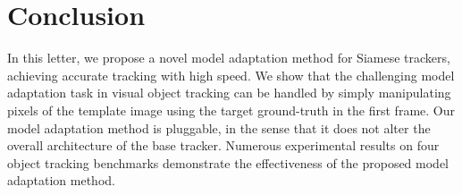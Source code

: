\documentclass[journal]{IEEEtran}
\begin{document}
\section{Conclusion}
In this letter, we propose a novel model adaptation method for Siamese trackers, achieving accurate tracking with high speed. We show that the challenging model adaptation task in visual object tracking can be handled by simply manipulating pixels of the template image using the target ground-truth in the first frame. Our model adaptation method is pluggable, in the sense that it does not alter the overall architecture of the base tracker. Numerous experimental results on four object tracking benchmarks demonstrate the effectiveness of the proposed model adaptation method.
\newpage
\balance


\end{document}

